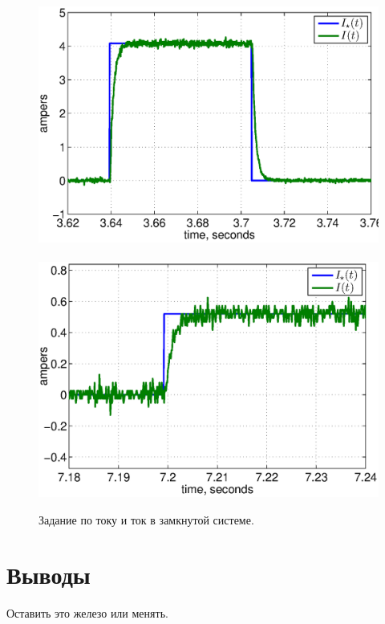 \documentclass{scrartcl}
\begin{document}
\begin{figure}
    \centering
    \includegraphics[height=.3\linewidth]{Fig/CL_meandr.eps} 
    ~
    \includegraphics[height=.3\linewidth]{Fig/CL_meandr2.eps} 
    \caption{Задание по току и ток в замкнутой системе.}
    \label{fig:ClosedLoop}
\end{figure}

\section{Выводы}
Оставить это железо или менять.
\end{document}
